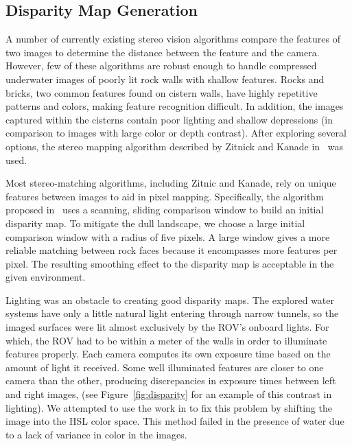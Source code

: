 \documentclass{llncs}
\begin{document}
\subsection{Disparity Map Generation}
\label{disparityMapGeneration}
\noindent A number of currently existing stereo vision algorithms compare the features of two images to determine the distance between the feature and the camera. However, few of these algorithms are robust enough to handle compressed underwater images of poorly lit rock walls with shallow features. Rocks and bricks, two common features found on cistern walls, have highly repetitive patterns and colors, making feature recognition difficult. In addition, the images captured within the cisterns contain poor lighting and shallow depressions (in comparison to images with large color or depth contrast). After exploring several options, the stereo mapping algorithm described by Zitnick and Kanade in~\cite{stereo:zitKan} was used.

Most stereo-matching algorithms, including Zitnic and Kanade, rely on unique features between images to aid in pixel mapping. Specifically, the algorithm proposed in~\cite{stereo:zitKan} uses a scanning, sliding comparison window to build an initial disparity map. To mitigate the dull landscape, we choose a large initial comparison window with a radius of five pixels. A large window gives a more reliable matching between rock faces because it encompasses more features per pixel. The resulting smoothing effect to the disparity map is acceptable in the given environment.

Lighting was an obstacle to creating good disparity maps. The explored water systems have only a little natural light entering through narrow tunnels, so the imaged surfaces were lit almost exclusively by the ROV's onboard lights.  For which, the ROV had to be within a meter of the walls in order to illuminate features properly. Each camera computes its own exposure time based on the amount of light it received. Some well illuminated features are closer to one camera than the other, producing discrepancies in exposure times between left and right images, (see Figure~\ref{fig:disparity} for an example of this contrast in lighting). We attempted to use the work in \cite{stereo:nalGast} to fix this problem by shifting the image into the HSL color space. This method failed in the presence of water due to a lack of variance in color in the images.
\end{document}
